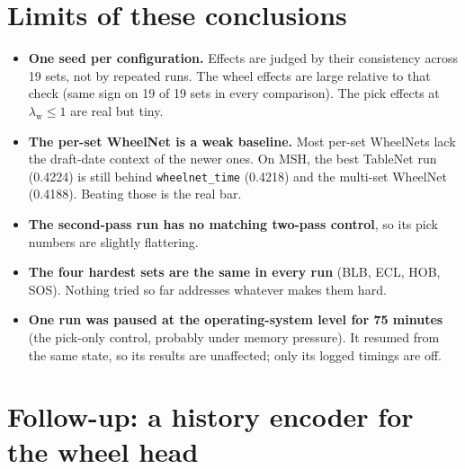 \documentclass[11pt,letterpaper]{article}
\newcommand{\code}[1]{\texttt{\small #1}}
\newcommand{\lw}{\lambda_{\text{w}}}
\begin{document}
\section{Limits of these conclusions}

\begin{itemize}
\item \textbf{One seed per configuration.} Effects are judged by their consistency across 19 sets, not by repeated
runs. The wheel effects are large relative to that check (same sign on 19 of 19 sets in every comparison). The
pick effects at $\lw\le1$ are real but tiny.
\item \textbf{The per-set WheelNet is a weak baseline.} Most per-set WheelNets lack the draft-date context of the
newer ones. On MSH, the best TableNet run (0.4224) is still behind \code{wheelnet\_time} (0.4218) and the
multi-set WheelNet (0.4188). Beating those is the real bar.
\item \textbf{The second-pass run has no matching two-pass control}, so its pick numbers are slightly flattering.
\item \textbf{The four hardest sets are the same in every run} (BLB, ECL, HOB, SOS). Nothing tried so far
addresses whatever makes them hard.
\item \textbf{One run was paused at the operating-system level for 75 minutes} (the pick-only control,
probably under memory pressure). It resumed from the same state, so its results are unaffected; only its logged
timings are off.
\end{itemize}

\section{Follow-up: a history encoder for the wheel head}\label{sec:next}
\end{document}
